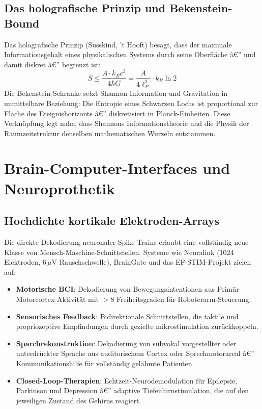 ﻿\documentclass[12pt,a4paper,titlepage]{report}
\begin{document}
\subsection{Das holografische Prinzip und Bekenstein-Bound}

Das holografische Prinzip (Susskind, 't Hooft) besagt, dass der maximale
Informationsgehalt eines physikalischen Systems durch seine Oberfläche â€”
und damit diskret â€” begrenzt ist:
\[
    S \leq \frac{A \cdot k_B c^3}{4\hbar G} = \frac{A}{4\ell_P^2} \cdot k_B \ln 2
\]
Die Bekenstein-Schranke setzt Shannon-Information und Gravitation in unmittelbare
Beziehung: Die Entropie eines Schwarzen Lochs ist proportional zur Fläche des
Ereignishorizonts â€” diskretisiert in Planck-Einheiten. Diese Verknüpfung legt nahe,
dass Shannons Informationstheorie und die Physik der Raumzeitstruktur denselben
mathematischen Wurzeln entstammen.

\section{Brain-Computer-Interfaces und Neuroprothetik}

\subsection{Hochdichte kortikale Elektroden-Arrays}

Die direkte Dekodierung neuronaler Spike-Trains erlaubt eine vollständig neue Klasse
von Mensch-Maschine-Schnittstellen. Systeme wie Neuralink (1024 Elektroden, $6\,\mu\mathrm{V}$ Rauschschwelle), BrainGate und das EF-STIM-Projekt zielen auf:
\begin{itemize}[leftmargin=2em]
    \item \textbf{Motorische BCI}: Dekodierung von Bewegungsintentionen aus
        Primär-Motorcortex-Aktivität mit $> 8$ Freiheitsgraden für Roboterarm-Steuerung.
    \item \textbf{Sensorisches Feedback}: Bidirektionale Schnittstellen, die
        taktile und propriozeptive Empfindungen durch gezielte mikrostimulation zurückkoppeln.
    \item \textbf{Sparchrekonstruktion}: Dekodierung von subvokal vorgestellter
        oder unterdrückter Sprache aus auditorischem Cortex oder Sprechmotorareal â€”
        Kommunikationshilfe für vollständig gelähmte Patienten.
    \item \textbf{Closed-Loop-Therapien}: Echtzeit-Neurodemodulation für
        Epilepsie, Parkinson und Depression â€” adaptive Tiefenhirnstimulation,
        die auf den jeweiligen Zustand des Gehirns reagiert.
\end{itemize}
\end{document}
